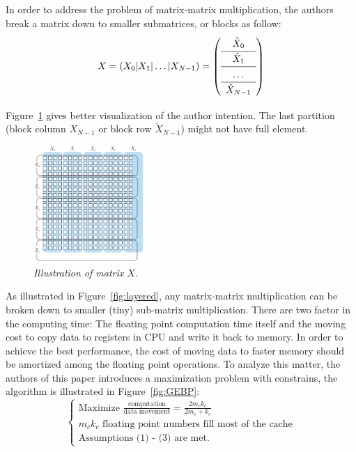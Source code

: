 \documentclass[a4paper,12pt]{article}
\begin{document}
In order to address the problem of matrix-matrix multiplication, the authors break a matrix down to smaller submatrices, or blocks as follow:
$$ X = (X_0 | X_1 | \ldots | X_{N-1}) =
\renewcommand\arraystretch{1.3}
\mleft(
\begin{array}{c}
    \check{X}_0 \\
    \hline
    \check{X}_1 \\
    \hline
    \ldots \\
    \hline
    \check{X}_{N-1} \\
\end{array}
\mright)
$$

 Figure~\ref{fig:mat} gives better visualization of the author intention. The last partition (block column $X_{N-1}$ or block row $\check{X}_{N-1}$) might not have full element.

 \begin{figure}
    \vspace{-1em}
    \centering
        \includegraphics[width=0.38\textwidth]{fmcs_a3_block}
    \vspace{-1em}
    \caption{\emph{Illustration of matrix $X$.}}
    \label{fig:mat}
    \vspace{-2em}
\end{figure}

As illustrated in Figure~\ref{fig:layered}, any matrix-matrix multiplication can be broken down to smaller (tiny) sub-matrix multiplication. There are two factor in the computing time: The floating point computation time itself and the moving cost to copy data to registers in CPU and write it back to memory. In order to achieve the best performance, the cost of moving data to faster memory should be amortized among the floating point operations. To analyze this matter, the authors of this paper introduces a maximization problem with constrains, the algorithm is illustrated in Figure~\ref{fig:GEBP}:
\[
\begin{cases}
    \mbox{Maximize } \frac{\mbox{computation}}{\mbox{data movement}} = \displaystyle \frac{2m_ck_c}{2m_c+k_c} \\
    m_ck_c \mbox{ floating point numbers fill most of the cache} \\
    \mbox{Assumptions (1) - (3) are met.}
\end{cases}
\]
\end{document}
